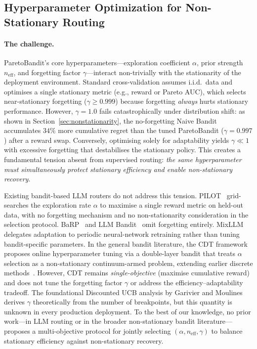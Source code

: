 
\subsection{Hyperparameter Optimization for Non-Stationary Routing}
\label{sec:hparam_sweep}

\paragraph{The challenge.}
ParetoBandit's core hyperparameters---exploration coefficient
$\alpha$, prior strength $n_{\text{eff}}$, and forgetting factor
$\gamma$---interact non-trivially with the stationarity of the
deployment environment.
Standard cross-validation assumes i.i.d.\ data and optimises a
single stationary metric (e.g., reward or Pareto AUC), which
selects near-stationary forgetting ($\gamma \geq 0.999$)
because forgetting \emph{always} hurts stationary performance.
However, $\gamma{=}1.0$ fails catastrophically under distribution
shift: as shown in Section~\ref{sec:nonstationarity}, the
no-forgetting Naive Bandit accumulates $34\%$ more cumulative regret
than the tuned ParetoBandit ($\gamma{=}0.997$) after a reward swap.
Conversely, optimising solely for adaptability yields
$\gamma \ll 1$ with excessive forgetting that destabilises the
stationary policy.
This creates a fundamental tension absent from supervised routing:
\emph{the same hyperparameter must simultaneously protect stationary
efficiency and enable non-stationary recovery}.

Existing bandit-based LLM routers do not address this tension.
PILOT~\cite{panda2025pilot} grid-searches the exploration rate
$\alpha$ to maximise a single reward metric on held-out data,
with no forgetting mechanism and no non-stationarity consideration
in the selection protocol.
BaRP~\cite{wang2025barp} and LLM Bandit~\cite{li2025llmbandit}
omit forgetting entirely.
MixLLM~\cite{wang2025mixllm} delegates adaptation to periodic
neural-network retraining rather than tuning bandit-specific
parameters.
In the general bandit literature, the CDT framework~\cite{kang2024cdt}
proposes online hyperparameter tuning via a double-layer bandit that
treats $\alpha$ selection as a non-stationary continuum-armed problem,
extending earlier discrete methods~\cite{bouneffouf2020oplinucb}.
However, CDT remains \emph{single-objective} (maximise cumulative
reward) and does not tune the forgetting factor $\gamma$ or address
the efficiency--adaptability tradeoff.
The foundational Discounted UCB analysis by
Garivier and Moulines~\cite{garivier2011switching} derives $\gamma$
theoretically from the number of breakpoints, but this quantity is
unknown in every production deployment.
To the best of our knowledge, no prior work---in LLM routing or in
the broader non-stationary bandit literature---proposes a
multi-objective protocol for jointly selecting $(\alpha, n_{\text{eff}},
\gamma)$ to balance stationary efficiency against non-stationary
recovery.

